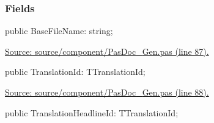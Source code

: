 \documentclass{report}
\newif\ifpdf
\begin{document}
\subsubsection*{\large{\textbf{Fields}}\normalsize\hspace{1ex}\hfill}
\begin{list}{}{
\setlength{\itemindent}{0cm}
\setlength{\listparindent}{0cm}
\setlength{\leftmargin}{\evensidemargin}
\addtolength{\leftmargin}{\tmplength}
\settowidth{\labelsep}{X}
\addtolength{\leftmargin}{\labelsep}
\setlength{\labelwidth}{\tmplength}
}
\label{PasDoc_Gen.TOverviewFileInfo-BaseFileName}
\item[\textbf{BaseFileName}\hfill]
\ifpdf
\begin{flushleft}
\fi
\begin{ttfamily}
public BaseFileName: string;\end{ttfamily}

\ifpdf
\end{flushleft}
\fi


\par  \par
\href{https://github.com/pasdoc/pasdoc/blob/master/source/component/PasDoc_Gen.pas#L87}{Source: source/component/PasDoc{\_}Gen.pas (line 87).}\label{PasDoc_Gen.TOverviewFileInfo-TranslationId}
\item[\textbf{TranslationId}\hfill]
\ifpdf
\begin{flushleft}
\fi
\begin{ttfamily}
public TranslationId: TTranslationId;\end{ttfamily}

\ifpdf
\end{flushleft}
\fi


\par  \par
\href{https://github.com/pasdoc/pasdoc/blob/master/source/component/PasDoc_Gen.pas#L88}{Source: source/component/PasDoc{\_}Gen.pas (line 88).}\label{PasDoc_Gen.TOverviewFileInfo-TranslationHeadlineId}
\item[\textbf{TranslationHeadlineId}\hfill]
\ifpdf
\begin{flushleft}
\fi
\begin{ttfamily}
public TranslationHeadlineId: TTranslationId;\end{ttfamily}

\ifpdf
\end{flushleft}
\fi



\end{list}
\end{document}
